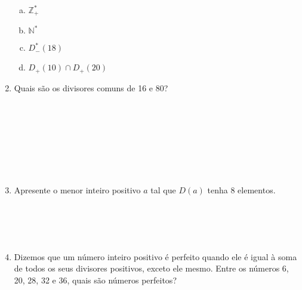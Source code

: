 \documentclass[a4paper,14pt]{article}
\begin{document}
\begin{multicols}{2}
\begin{enumerate}
\begin{enumerate}[a)]
			\item $\mathbb{Z}_+^*$
			\item $\mathbb{N}^*$
			\item $D_-^*(18)$
			\item $D_+(10) \cap D_+(20)$
		\end{enumerate}
		\item Quais são os divisores comuns de 16 e 80? \\\\\\\\\\\\\\\\
		\item Apresente o menor inteiro positivo $a$ tal que $D(a)$ tenha 8 elementos. \\\\\\\\\\
		\item Dizemos que um número inteiro positivo é perfeito quando ele é igual à soma de todos os seus divisores positivos, exceto ele mesmo. Entre os números 6, 20, 28, 32 e 36, quais são números perfeitos?
		\end{enumerate}
		$~$ \\ $~$ \\ $~$ \\ $~$ \\ $~$ \\ $~$ \\ $~$
	\end{multicols}
\end{document}
